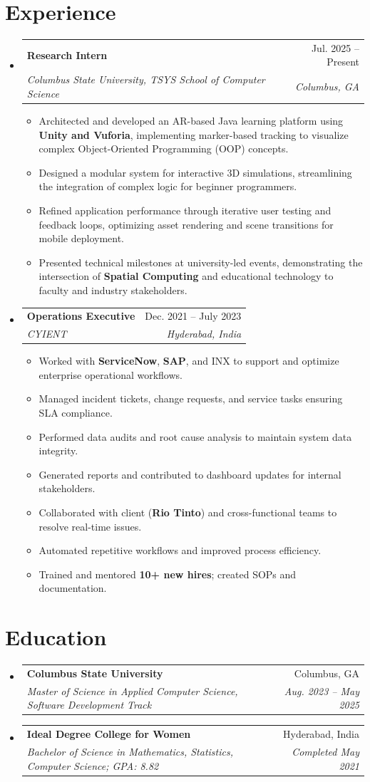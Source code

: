 \documentclass[letterpaper,11pt]{article}
\makeatletter
\newcommand{\resumeItem}[1]{
  \item\small{
    {#1 \vspace{-2pt}}
  }
}
\newcommand{\resumeSubheading}[4]{
  \vspace{-2pt}\item
    \begin{tabular*}{\textwidth}[t]{l@{\extracolsep{\fill}}r}
      \textbf{#1} & #2 \\
      \textit{\small#3} & \textit{\small #4} \\
    \end{tabular*}\vspace{-7pt}
}
\newcommand{\resumeSubHeadingListStart}{\begin{itemize}[leftmargin=0.15in, label={}]}
\newcommand{\resumeSubHeadingListEnd}{\end{itemize}}
\newcommand{\resumeItemListStart}{\begin{itemize}}
\newcommand{\resumeItemListEnd}{\end{itemize}\vspace{-5pt}}
\makeatother
\begin{document}
\section{Experience}
\vspace{-15pt}
\resumeSubHeadingListStart
\resumeSubheading
{Research Intern}{Jul. 2025 -- Present}
{Columbus State University, TSYS School of Computer Science}{Columbus, GA}
\resumeItemListStart
    \resumeItem{Architected and developed an AR-based Java learning platform using \textbf{Unity and Vuforia}, implementing marker-based tracking to visualize complex Object-Oriented Programming (OOP) concepts.}
    \resumeItem{Designed a modular system for interactive 3D simulations, streamlining the integration of complex logic for beginner programmers.}
    \resumeItem{Refined application performance through iterative user testing and feedback loops, optimizing asset rendering and scene transitions for mobile deployment.}
    \resumeItem{Presented technical milestones at university-led events, demonstrating the intersection of \textbf{Spatial Computing} and educational technology to faculty and industry stakeholders.}
\resumeItemListEnd

  \resumeSubheading
    {Operations Executive}{Dec. 2021 -- July 2023}
    {CYIENT}{Hyderabad, India}
    \resumeItemListStart
      \resumeItem{Worked with \textbf{ServiceNow}, \textbf{SAP}, and INX to support and optimize enterprise operational workflows.}
      \resumeItem{Managed incident tickets, change requests, and service tasks ensuring SLA compliance.}
      \resumeItem{Performed data audits and root cause analysis to maintain system data integrity.}
      \resumeItem{Generated reports and contributed to dashboard updates for internal stakeholders.}
      \resumeItem{Collaborated with client (\textbf{Rio Tinto}) and cross-functional teams to resolve real-time issues.}
      \resumeItem{Automated repetitive workflows and improved process efficiency.}
      \resumeItem{Trained and mentored \textbf{10+ new hires}; created SOPs and documentation.}
    \resumeItemListEnd

\resumeSubHeadingListEnd

\section{Education}
\vspace{-15pt}
  \resumeSubHeadingListStart
    \resumeSubheading
      {Columbus State University}{Columbus, GA}
      {Master of Science in Applied Computer Science, Software Development Track}{Aug. 2023 -- May 2025}
      \vspace{-10pt}
    \resumeSubheading
      {Ideal Degree College for Women}{Hyderabad, India}
      {Bachelor of Science in Mathematics, Statistics, Computer Science; GPA: 8.82}{Completed May 2021}
  \resumeSubHeadingListEnd
\end{document}
